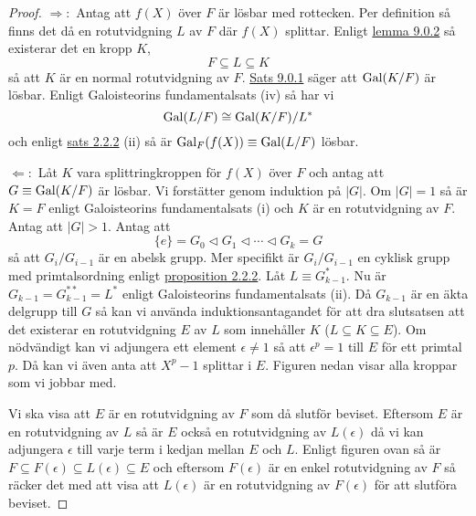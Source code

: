 \documentclass{article}
\newcommand{\gal}[0]{\textnormal{Gal}}
\theoremstyle{definition}
\begin{document}
\begin{proof}
  $\Rightarrow:$ Antag att $f(X)$ över $F$ är lösbar med rottecken. Per definition så finns det då en rotutvidgning $L$ av $F$ där 
  $f(X)$ splittar. Enligt \hyperlink{lemma10.0.2}{lemma 9.0.2} så existerar det en kropp $K$,
  \[ F \subseteq L \subseteq K\]
  så att $K$ är en normal rotutvidgning av $F$. \hyperlink{sats10.0.1}{Sats 9.0.1} säger att $\gal(K/F)$ är lösbar. Enligt 
  Galoisteorins fundamentalsats (iv) så har vi 
  \[\gal(L/F) \cong \gal(K/F)/L^*\]
  och enligt \hyperlink{sats3.2.2}{sats 2.2.2} (ii) så är $\gal_F(f(X)) \equiv \gal(L/F)$ lösbar. 

  $\Leftarrow:$ Låt $K$ vara splittringkroppen för $f(X)$ över $F$ och antag att $G \equiv \gal(K/F)$ är lösbar. 
  Vi forstätter genom induktion på $|G|$. Om $|G| = 1$ så är $K = F$ enligt Galoisteorins fundamentalsats (i) och 
  $K$ är en rotutvidgning av $F$. Antag att $|G| > 1$. Antag att 
  \[ \{e\} = G_0 \triangleleft G_1 \triangleleft \cdots \triangleleft G_k = G \]
  så att $G_i/G_{i-1}$ är en abelsk grupp. Mer specifikt är $G_i/G_{i-1}$ en cyklisk grupp med primtalsordning enligt 
  \hyperlink{prop3.2.2}{proposition 2.2.2}. Låt $L \equiv G_{k-1}^*$. Nu är $G_{k-1} = G_{k-1}^{**} = L^*$ enligt Galoisteorins fundamentalsats (ii).
  Då $G_{k-1}$ är en äkta delgrupp till $G$ så kan vi använda induktionsantagandet för att dra slutsatsen att det 
  existerar en rotutvidgning $E$ av $L$ som innehåller $K$ ($L \subseteq K \subseteq E$). Om nödvändigt kan vi 
  adjungera ett element $\epsilon \neq 1$ så att $\epsilon^p = 1$ till $E$ för ett primtal $p$. Då kan vi även anta att $X^p -1$ splittar i $E$.
  Figuren nedan visar alla kroppar som vi jobbar med.

  \begin{center}
  \end{center}

  Vi ska visa att $E$ är en rotutvidgning av $F$ som då slutför beviset. Eftersom $E$ är en rotutvidgning av $L$ så är 
  $E$ också en rotutvidgning av $L(\epsilon)$ då vi kan adjungera $\epsilon$ till varje term i kedjan mellan $E$ och $L$.
  Enligt figuren ovan så är $F \subseteq F(\epsilon) \subseteq L(\epsilon) \subseteq E$ och eftersom 
  $F(\epsilon)$ är en enkel rotutvidgning av $F$ så räcker det med att visa att $L(\epsilon)$ är en rotutvidgning av $F(\epsilon)$
  för att slutföra beviset.


\end{proof}
\end{document}
